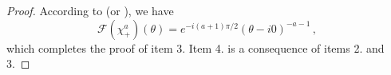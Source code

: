 \documentclass[
	fontsize=11pt, 
	twoside=false, 
	abstract=true, 
	a4paper,
]{scrartcl}
\newcommand{\RR}{\mathbb{R}}
\newcommand{\dd}{\mathrm{d}}
\newcommand{\del}{\partial}
\begin{document}
\begin{proof}
 	According to \cite[Exa.~7.1.17]{hoermander1} (or \cite[p.~172]{MR0166596}), we have
	\[
		\mathcal{F}(\chi_+^a)(\theta) = e^{-i(a+1)\pi/2}(\theta-i0)^{-a-1}\,,
	\]
	which completes the proof of item 3. Item 4. is a consequence of items 2. and 3.
\end{proof}

%

\end{document}
